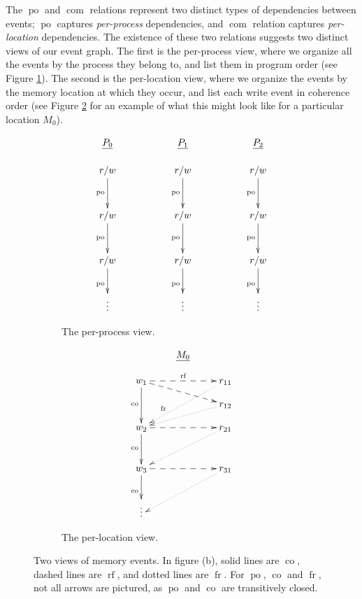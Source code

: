 \documentclass[]{eptcs}
\DeclareMathOperator{\po}{po}
\DeclareMathOperator{\co}{co}
\DeclareMathOperator{\rf}{rf}
\DeclareMathOperator{\fr}{fr}
\DeclareMathOperator{\com}{com}
\begin{document}
The $\po$ and $\com$ relations represent two distinct types of dependencies between events; $\po$ captures \emph{per-process} dependencies, and $\com$ relation captures \emph{per-location} dependencies. The existence of these two relations suggests two distinct views of our event graph. The first is the per-process view, where we organize all the events by the process they belong to, and list them in program order (see Figure \ref{events:process}). The second is the per-location view, where we organize the events by the memory location at which they occur, and list each write event in coherence order (see Figure \ref{events:location} for an example of what this might look like for a particular location $M_0$).
\begin{figure}[t]
\begin{subfigure}{.5\textwidth}
\[
\xymatrix@R1pc{
\underline{P_0} && \underline{P_1} && \underline{P_2}\\
r/w \ar[dd]_{\po} && r/w \ar[dd]_{\po} && r/w \ar[dd]_{\po} \\\\
r/w \ar[dd]_{\po} && r/w \ar[dd]_{\po} && r/w \ar[dd]_{\po} \\\\
r/w \ar[dd]_{\po} && r/w \ar[dd]_{\po} && r/w \ar[dd]_{\po} \\\\
\vdots && \vdots && \vdots \\
}
\]
\caption{The per-process view.}
\label{events:process}
\end{subfigure}
\begin{subfigure}{.5\textwidth}
\[
\xymatrix@R1pc{
& \underline{M_0} &\\
w_1 \ar[dd]_{\co} \ar@{-->}[rr]^{\rf} \ar@{-->}[drr] && r_{11} \ar@{..>}[ddll]_(0.7){\fr} \\
                                                     && r_{12} \ar@{..>}[dll] \\
w_2 \ar[dd]_{\co} \ar@{-->}[rr]                      && r_{21} \ar@{..>}[ddll]\\\\
w_3 \ar[dd]_{\co} \ar@{-->}[rr]                      && r_{31} \ar@{..>}[ddll]\\\\
\vdots 
}
\]
\caption{The per-location view.}
\label{events:location}
\end{subfigure}
\caption{Two views of memory events. In figure (b), solid lines are $\co$, dashed lines are $\rf$, and dotted lines are $\fr$. For $\po$, $\co$ and $\fr$, not all arrows are pictured, as $\po$ and $\co$ are transitively closed.}
\label{events}
\end{figure}
\end{document}
